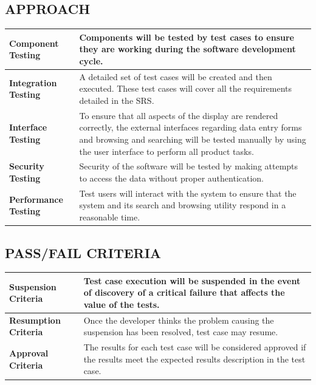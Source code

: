 \documentclass[twoside,letterpaper]{article}
\begin{document}
\subsection{APPROACH}

\begin{center}
\begin{tabular}{ | M{4cm} | M{12cm}| } 
\hline
\textbf{Component Testing} & Components will be tested by test cases to ensure they are working during the software development cycle.\\ 
\hline
\textbf{Integration Testing} & A detailed set of test cases will be created and then executed.  These test cases will cover all the requirements detailed in the SRS.\\ 
\hline
\textbf{Interface Testing} & To ensure that all aspects of the display are rendered correctly, the external interfaces regarding data entry forms and browsing and searching will be tested manually by using the user interface to perform all product tasks.\\ 
\hline
\textbf{Security Testing} & Security of the software will be tested by making attempts to access the data without proper authentication.\\ 
\hline
\textbf{Performance Testing} & Test users will interact with the system to ensure that the system and its search and browsing utility respond in a reasonable time.\\ 
\hline
\end{tabular}
\end{center}

\subsection{PASS/FAIL CRITERIA}
\begin{center}
\begin{tabular}{ | M{4cm} | M{12cm}| } 
\hline
\textbf{Suspension Criteria} & Test case execution will be suspended in the event of discovery of a critical failure that affects the value of the tests.\\ 
\hline
\textbf{Resumption Criteria} & Once the developer thinks the problem causing the suspension has been resolved, test case may resume.\\ 
\hline
\textbf{Approval Criteria} & The results for each test case will be considered approved if the results meet the expected results description in the test case.\\ 
\hline
\end{tabular}
\end{center}
\end{document}
